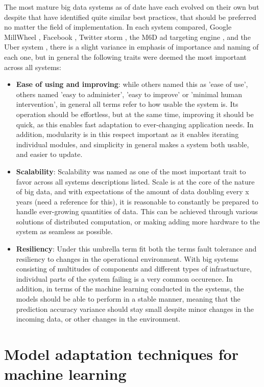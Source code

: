 The most mature big data systems as of date have each evolved on their own but despite that have identified quite similar best practices, that should be preferred no matter the field of implementation. In each system compared, Google MillWheel \cite{millwheel}, Facebook \cite{facebook}, Twitter storm \cite{storm@twitter}, the M6D ad targeting engine \cite{designprinciples}, and the Uber system \cite{uber}, there is a slight variance in emphasis of importance and naming of each one, but in general the following traits were deemed the most important across all systems:

\begin{itemize}
    \item \textbf{Ease of using and improving}: while others named this as 'ease of use', others named 'easy to administer', 'easy to improve' or 'minimal human intervention', in general all terms refer to how usable the system is. Its operation should be effortless, but at the same time, improving it should be quick, as this enables fast adaptation to ever-changing application needs. In addition, modularity is in this respect important as it enables iterating individual modules, and simplicity in general makes a system both usable, and easier to update.
    \item \textbf{Scalability}: Scalability was named as one of the most important trait to favor across all systems descriptions listed. Scale is at the core of the nature of big data, and with expectations of the amount of data doubling every x years (need a reference for this), it is reasonable to constantly be prepared to handle ever-growing quantities of data. This can be achieved through various solutions of distributed computation, or making adding more hardware to the system as seamless as possible.
    \item \textbf{Resiliency}: Under this umbrella term fit both the terms fault tolerance and resiliency to changes in the operational environment. With big systems consisting of multitudes of components and different types of infrastucture, individual parts of the system failing is a very common occurence. In addition, in terms of the machine learning conducted in the systems, the models should be able to perform in a stable manner, meaning that the prediction accuracy variance should stay small despite minor changes in the incoming data, or other changes in the environment.
\end{itemize}

\section{Model adaptation techniques for machine learning}

